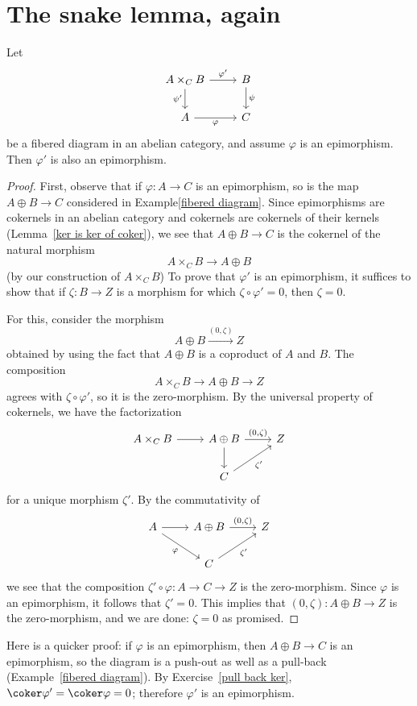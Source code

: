 \section{The snake lemma, again}
\begin{lemma}\label{pull bak lem}
Let
\[\begin{tikzcd}
A\times_{C}B\ar[d,swap,"\psi'"]\ar[r,"\varphi'"]&B\ar[d,"\psi"]\\
A\ar[r,swap,"\varphi"]&C
\end{tikzcd}\]
be a fibered diagram in an abelian category, and assume $\varphi$ is an epimorphism. Then $\varphi'$ is also an epimorphism.
\end{lemma}
\begin{proof}
First, observe that if $\varphi:A\to C$ is an epimorphism, so is the map $A\oplus B\to C$ considered in Example\ref{fibered diagram}. Since epimorphisms are cokernels in an abelian
category and cokernels are cokernels of their kernels (Lemma~\ref{ker is ker of coker}), we see that $A\oplus B\to C$ is the cokernel of the natural morphism
\[A\times_{C}B\to A\oplus B\]
(by our construction of $A\times_{C}B$) To prove that $\varphi'$ is an epimorphism, it suffices to show that if $\zeta:B\to Z$ is a morphism for which $\zeta\circ\varphi'=0$, then $\zeta=0$.\par
For this, consider the morphism
\[A\oplus B\stackrel{(0,\zeta)}{\longrightarrow}Z\]
obtained by using the fact that $A\oplus B$ is a coproduct of $A$ and $B$. The composition
\[A\times_{C}B\to A\oplus B\to Z\]
agrees with $\zeta\circ\varphi'$, so it is the zero-morphism. By the universal property of cokernels, we have the factorization
\[\begin{tikzcd}
A\times_{C}B\ar[r]&A\oplus B\ar[d]\ar[r,"{(0,\zeta)}"]&Z\\
&C\ar[ru,swap,"\zeta'"]&
\end{tikzcd}\]
for a unique morphism $\zeta'$. By the commutativity of
\[\begin{tikzcd}
A\ar[rd,swap,"\varphi"]\ar[r]&A\oplus B\ar[r,"{(0,\zeta)}"]&Z\\
&C\ar[ru,swap,"\zeta'"]
\end{tikzcd}\]
we see that the composition $\zeta'\circ\varphi:A\to C\to Z$ is the zero-morphism. Since $\varphi$ is an epimorphism, it follows that $\zeta'=0$. This implies that $(0,\zeta):A\oplus B\to Z$ is the zero-morphism, and we are done: $\zeta=0$ as promised.
\end{proof}
Here is a quicker proof: if $\varphi$ is an epimorphism, then $A\oplus B\to C$ is an epimorphism, so the diagram is a push-out as well as a pull-back (Example~\ref{fibered diagram}). By Exercise~\ref{pull back ker}, $\coker\varphi'=\coker\varphi=0$; therefore $\varphi'$ is an epimorphism.\par
